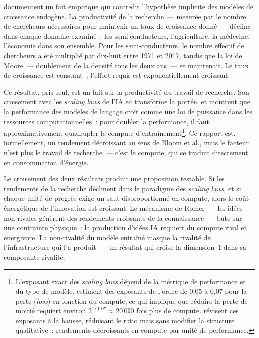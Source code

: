 \markNEO \markEVO
\textcite{bloom_ideas_2020} documentent un fait empirique qui contredit l'hypothèse implicite des modèles de croissance endogène. La productivité de la recherche~--- mesurée par le nombre de chercheurs nécessaires pour maintenir un taux de croissance donné~--- décline dans chaque domaine examiné~: les semi-conducteurs, l'agriculture, la médecine, l'économie dans son ensemble. Pour les semi-conducteurs, le nombre effectif de chercheurs a été multiplié par dix-huit entre 1971 et 2017, tandis que la loi de Moore~--- doublement de la densité tous les deux ans~--- se maintenait. Le taux de croissance est constant~; l'effort requis est exponentiellement croissant. 

Ce résultat, pris seul, est un fait sur la productivité du travail de recherche. Son croisement avec les \emph{scaling laws} de l'IA en transforme la portée. \textcite{kaplan_scaling_2020} et \textcite{hoffmann_training_2022} montrent que la performance des modèles de langage croît comme une loi de puissance dans les ressources computationnelles~: pour doubler la performance, il faut approximativement quadrupler le compute d'entraînement\footnote{L'exposant exact des \emph{scaling laws} dépend de la métrique de performance et du type de modèle. \textcite{kaplan_scaling_2020} estiment des exposants de l'ordre de 0,05 à 0,07 pour la perte (\emph{loss}) en fonction du compute, ce qui implique que réduire la perte de moitié requiert environ $2^{1/0,07} \approx 20\,000$ fois plus de compute. \textcite{hoffmann_training_2022} révisent ces exposants à la hausse, réduisant le ratio mais sans modifier la structure qualitative~: rendements décroissants en compute par unité de performance.}. Ce rapport est, formellement, un rendement décroissant au sens de Bloom et al., mais le facteur n'est plus le travail de recherche~--- c'est le compute, qui se traduit directement en consommation d'énergie.

Le croisement des deux résultats produit une proposition testable. Si les rendements de la recherche déclinent dans le paradigme des \emph{scaling laws}, et si chaque unité de progrès exige un saut disproportionné en compute, alors le coût énergétique de l'innovation est croissant. Le mécanisme de Romer~--- les idées non-rivales génèrent des rendements croissants de la connaissance~--- bute sur une contrainte physique~: la production d'\og idées IA\fg{} requiert du compute rival et énergivore. La non-rivalité du modèle entraîné masque la rivalité de l'infrastructure qui l'a produit~--- un résultat qui croise la dimension~1 dans sa composante rivalité.

